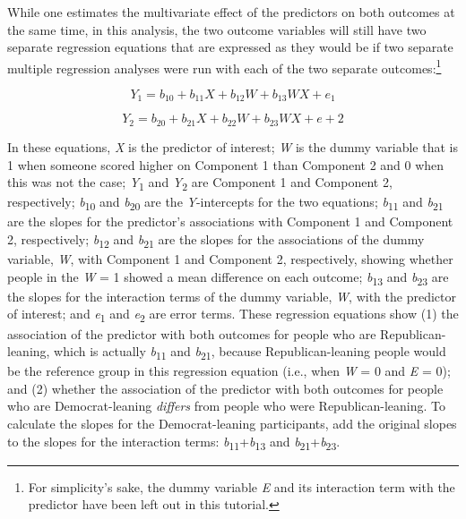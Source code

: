 \documentclass[authordate, meta]{jote-new-article}
\begin{document}
	While one estimates the multivariate effect of the predictors on both outcomes at the same time, in this analysis, the two outcome variables will still have two separate regression equations that are expressed as they would be if two separate multiple regression analyses were run with each of the two separate outcomes:\footnote{ For simplicity's sake, the dummy variable \emph{E} and its interaction term with the predictor have been left out in this tutorial.}



	\begin{equation}
		Y_1= b_{10}+b_{11}X+b_{12}W+b_{13}WX+e_1
	\end{equation}



	\begin{equation}
		Y_2= b_{20}+b_{21}X+b_{22}W+b_{23}WX+e+2
	\end{equation}



	In these equations, \emph{X }is the predictor of interest; \emph{W} is the dummy variable that is 1 when someone scored higher on Component 1 than Component 2 and 0 when this was not the case; \emph{Y}\textsubscript{1} and \emph{Y}\textsubscript{2} are Component 1 and Component 2, respectively; \emph{b}\textsubscript{10}\textsubscript{ }and \emph{b}\textsubscript{20} are the \emph{Y}-intercepts for the two equations; \emph{b}\textsubscript{11} and \emph{b}\textsubscript{21} are the slopes for the predictor's associations with Component 1 and Component 2, respectively; \emph{b}\textsubscript{12} and \emph{b}\textsubscript{21} are the slopes for the associations of the dummy variable, \emph{W}, with Component 1 and Component 2, respectively, showing whether people in the \emph{W} = 1 showed a mean difference on each outcome; \emph{b}\textsubscript{13} and \emph{b}\textsubscript{23} are the slopes for the interaction terms of the dummy variable, \emph{W}, with the predictor of interest; and \emph{e}\textsubscript{1} and \emph{e}\textsubscript{2} are error terms. These regression equations show (1) the association of the predictor with both outcomes for people who are Republican-leaning, which is actually \emph{b}\textsubscript{11} and \emph{b}\textsubscript{21}, because Republican-leaning people would be the reference group in this regression equation (i.e., when \emph{W} = 0 and \emph{E} = 0); and (2) whether the association of the predictor with both outcomes for people who are Democrat-leaning \emph{differs} from people who were Republican-leaning. To calculate the slopes for the Democrat-leaning participants, add the original slopes to the slopes for the interaction terms: \emph{b}\textsubscript{11}+\emph{b}\textsubscript{13} and \emph{b}\textsubscript{21}+\emph{b}\textsubscript{23}.
\end{document}
